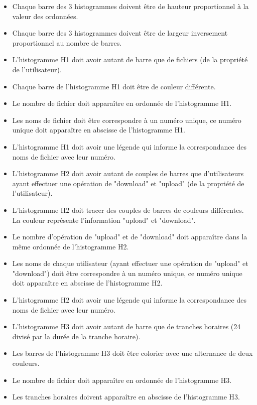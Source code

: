 \documentclass[10pt,a4paper]{report}
\begin{document}
\begin{itemize}[label = $\triangleright$]
			\item Chaque barre des 3 histogrammes doivent être de hauteur proportionnel à la valeur des ordonnées.

			\item Chaque barre des 3 histogrammes doivent être de largeur inversement proportionnel au nombre de barres.

			\item L'histogramme H1 doit avoir autant de barre que de fichiers (de la propriété de l'utilisateur).

			\item Chaque barre de l'histogramme H1 doit être de couleur différente.

			\item Le nombre de fichier doit apparaître en ordonnée de l'histogramme H1.

			\item Les noms de fichier doit être correspondre à un numéro unique, ce numéro unique doit apparaître en abscisse de l'histogramme H1.

			\item L'histogramme H1 doit avoir une légende qui informe la correspondance des noms de fichier avec leur numéro.

			\item L'histogramme H2 doit avoir autant de couples de barres que d'utilisateurs ayant effectuer une opération de "download" et "upload" (de la propriété de l'utilisateur).

			\item L'histogramme H2 doit tracer des couples de barres de couleurs différentes. La couleur représente l'information "upload" et "download".

			\item Le nombre d'opération de "upload" et de "download" doit apparaître dans la même ordonnée de l'histogramme H2.

			\item Les noms de chaque utilisateur (ayant effectuer une opération de "upload" et "download") doit être correspondre à un numéro unique, ce numéro unique doit apparaître en abscisse de l'histogramme H2.

			\item L'histogramme H2 doit avoir une légende qui informe la correspondance des noms de fichier avec leur numéro.

			\item L'histogramme H3 doit avoir autant de barre que de tranches horaires (24 divisé par la durée de la tranche horaire).

			\item Les barres de l'histogramme H3 doit être colorier avec une alternance de deux couleurs.

			\item Le nombre de fichier doit apparaître en ordonnée de l'histogramme H3.

			\item Les tranches horaires doivent apparaître en abscisse de l'histogramme H3.

		\end{itemize}
\end{document}
